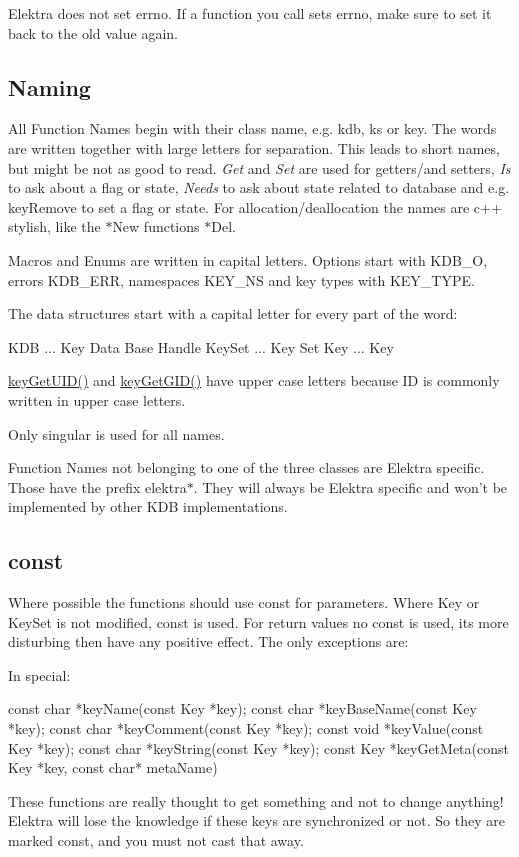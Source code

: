 Elektra does not set errno. If a function you call sets errno, make sure to set it back to the old value again.

\subsection*{Naming}

All Function Names begin with their class name, e.\+g. kdb, ks or key. The words are written together with large letters for separation. This leads to short names, but might be not as good to read. {\itshape Get} and {\itshape Set} are used for getters/and setters, {\itshape Is} to ask about a flag or state, {\itshape Needs} to ask about state related to database and e.\+g. key\+Remove to set a flag or state. For allocation/deallocation the names are c++ stylish, like the $\ast$\+New functions $\ast$\+Del.

Macros and Enums are written in capital letters. Options start with K\+D\+B\+\_\+\+O, errors K\+D\+B\+\_\+\+E\+R\+R, namespaces K\+E\+Y\+\_\+\+N\+S and key types with K\+E\+Y\+\_\+\+T\+Y\+P\+E.

The data structures start with a capital letter for every part of the word\+: \begin{DoxyVerb}    KDB ... Key Data Base Handle  
    KeySet ... Key Set  
    Key ... Key  
\end{DoxyVerb}


\hyperlink{group__meta_gacaa5060e67b03f50ae49a3620c54bc46}{key\+Get\+U\+I\+D()} and \hyperlink{group__meta_ga46a95e81d7d7f4e3eb59e60e5f3738c0}{key\+Get\+G\+I\+D()} have upper case letters because I\+D is commonly written in upper case letters.

Only singular is used for all names.

Function Names not belonging to one of the three classes are Elektra specific. Those have the prefix elektra$\ast$. They will always be Elektra specific and won't be implemented by other K\+D\+B implementations.

\subsection*{const}

Where possible the functions should use const for parameters. Where Key or Key\+Set is not modified, const is used. For return values no const is used, its more disturbing then have any positive effect. The only exceptions are\+:

In special\+: \begin{DoxyVerb}    const char *keyName(const Key *key);  
    const char *keyBaseName(const Key *key);  
    const char *keyComment(const Key *key);  
    const void *keyValue(const Key *key);  
    const char *keyString(const Key *key);  
    const Key  *keyGetMeta(const Key *key, const char* metaName)  
\end{DoxyVerb}


These functions are really thought to get something and not to change anything! Elektra will lose the knowledge if these keys are synchronized or not. So they are marked const, and you must not cast that away. 